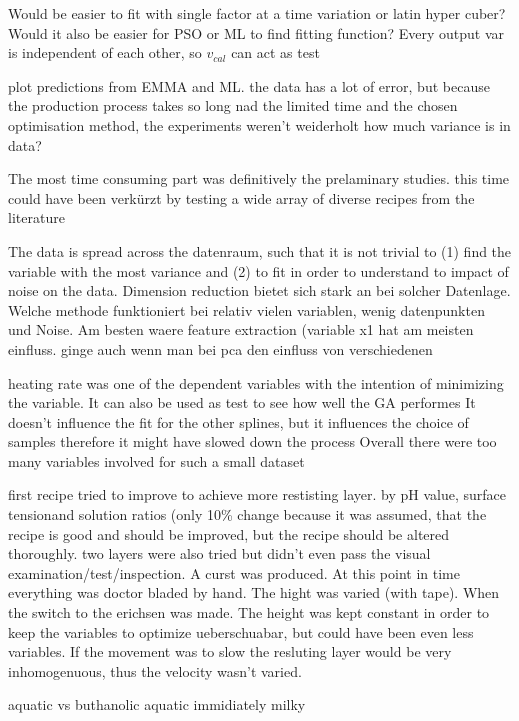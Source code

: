Would be easier to fit with single factor at a time variation or latin hyper cuber?
Would it also be easier for PSO or ML to find fitting function?
Every output var is independent of each other, so $v_{cal}$ can act as test 

plot predictions from EMMA and ML.
the data has a lot of error, but because the production process takes so long nad the limited time and the chosen optimisation method, the experiments weren't weiderholt
how much variance is in data? 

The most time consuming part was definitively the prelaminary studies.
this time could have been verkürzt by testing a wide array of diverse recipes from the literature

The data is spread across the datenraum, such that it is not trivial to (1) find the variable with the most variance and (2) to fit in order to understand to impact of noise on the data. 
Dimension reduction bietet sich stark an bei solcher Datenlage. 
Welche methode funktioniert bei relativ vielen variablen, wenig datenpunkten und Noise. 
Am besten waere feature extraction (variable x1 hat am meisten einfluss. ginge auch wenn man bei pca den einfluss von verschiedenen 

heating rate was one of the dependent variables with the intention of minimizing the variable. 
It can also be used as test to see how well the GA performes
It doesn't influence the fit for the other splines, but it influences the choice of samples therefore it might have slowed down the process
Overall there were too many variables involved for such a small dataset

first recipe tried to improve to achieve more restisting layer. by pH value, surface 
tensionand solution ratios (only 10\% change because it was assumed, that the recipe is 
good and should be improved, but the recipe should be altered thoroughly.
two layers were also tried but didn't even pass the visual examination/test/inspection. 
A curst was produced. 
At this point in time everything was doctor bladed by hand. The hight was varied (with tape).
When the switch to the erichsen was made. The height was kept constant in order to keep 
the variables to optimize ueberschuabar, but could have been even less variables.
If the movement was to slow the resluting  layer would be very inhomogenuous, thus the
velocity wasn't varied.

aquatic vs buthanolic
aquatic immidiately milky

